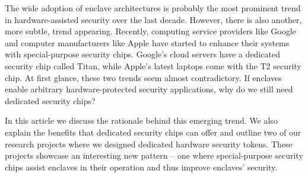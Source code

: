 The wide adoption of enclave architectures is probably the most prominent trend in hardware-assisted security over the last decade. However, there is also another, more subtle, trend appearing. Recently, computing service providers like Google and computer manufacturers like Apple have started to enhance their systems with special-purpose security chips. Google's cloud servers have a dedicated security chip called Titan, while Apple's latest laptops come with the T2 security chip. At first glance, these two trends seem almost contradictory. If enclaves enable arbitrary hardware-protected security applications, why do we still need dedicated security chips? 

In this article we discuss the rationale behind this emerging trend. We also explain the benefits that dedicated security chips can offer and outline two of our research projects where we designed dedicated hardware security tokens. These projects showcase an interesting new pattern -- one where special-purpose security chips assist enclaves in their operation and thus improve enclaves' security. 
